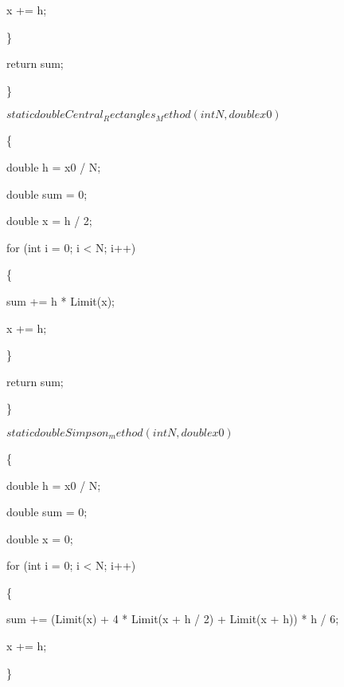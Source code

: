 \documentclass[12pt,a4paper]{report}
\begin{document}
			\hspace{2cm}x += h;
	
		\hspace{1cm}\}
	
		\hspace{1cm}return sum;
	
	\}
	
	$static double Central_Rectangles_Method(int N, double x0)$
	
	\{
	
		\hspace{1cm}double h = x0 / N;
	
		\hspace{1cm}double sum = 0;
	
		\hspace{1cm}double x = h / 2;
	
		\hspace{1cm}for (int i = 0; i < N; i++)
	
		\hspace{1cm}\{
	
			\hspace{2cm}sum += h * Limit(x);
	
			\hspace{2cm}x += h;
	
		\hspace{1cm}\}
	
		\hspace{1cm}return sum;
	
	\}
	
	$static double Simpson_method(int N, double x0)$
	
	\{
	
		\hspace{1cm}double h = x0 / N;
	
		\hspace{1cm}double sum = 0;
	
		\hspace{1cm}double x = 0;
	
		\hspace{1cm}for (int i = 0; i < N; i++)
	
		\hspace{1cm}\{
	
			\hspace{2cm}sum += (Limit(x) + 4 * Limit(x + h / 2) + Limit(x + h)) * h / 6;
	
			\hspace{2cm}x += h;
	
		\hspace{1cm}\}
	
\end{document}
